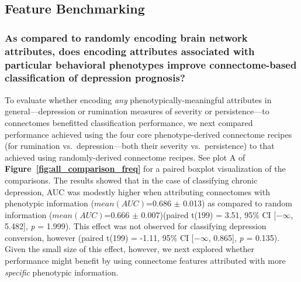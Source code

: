 \documentclass[
  notitlepage]{article}
\begin{document}
\hypertarget{feature-benchmarking}{%
\subsection{Feature Benchmarking}\label{feature-benchmarking}}
\hypertarget{as-compared-to-randomly-encoding-brain-network-attributes-does-encoding-attributes-associated-with-particular-behavioral-phenotypes-improve-connectome-based-classification-of-depression-prognosis}{%
\subsubsection{As compared to randomly encoding brain network
attributes, does encoding attributes associated with particular
behavioral phenotypes improve connectome-based classification of
depression
prognosis?}\label{as-compared-to-randomly-encoding-brain-network-attributes-does-encoding-attributes-associated-with-particular-behavioral-phenotypes-improve-connectome-based-classification-of-depression-prognosis}}
To evaluate whether encoding \emph{any} phenotypically-meaningful
attributes in general---depression or rumination measures of severity or
persistence---to connectomes benefitted classification performance, we
next compared performance achieved using the four core phenotype-derived
connectome recipes (for rumination vs.~depression---both their severity
vs.~persistence) to that achieved using randomly-derived connectome
recipes. See plot A of \textbf{Figure~\ref{fig:all_comparison_freq}} for a paired
boxplot visualization of the comparisons. The results showed that in the
case of classifying chronic depression, AUC was modestly higher when
attributing connectomes with phenotypic information (\(mean(AUC)\)=0.686
\(\pm\) 0.013) as compared to random information (\(mean(AUC)\)=0.666
\(\pm\) 0.007)(paired t(199) = 3.51, 95\% CI {[}\ensuremath{-\infty{}},
5.482{]}, \emph{p} = 1.999). This effect was not observed for
classifying depression conversion, however (paired t(199) = -1.11, 95\%
CI {[}\ensuremath{-\infty{}}, 0.865{]}, \emph{p} = 0.135). Given the
small size of this effect, however, we next explored whether performance
might benefit by using connectome features attributed with more
\emph{specific} phenotypic information.
\end{document}
